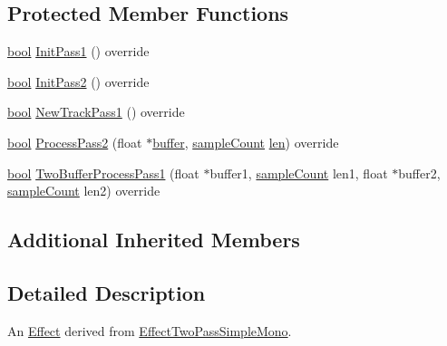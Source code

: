 \subsection*{Protected Member Functions}
\begin{DoxyCompactItemize}
\item 
\hyperlink{mac_2config_2i386_2lib-src_2libsoxr_2soxr-config_8h_abb452686968e48b67397da5f97445f5b}{bool} \hyperlink{class_effect_compressor_a20950a5cee99fbeb9bb59d547dce1e3f}{Init\+Pass1} () override
\item 
\hyperlink{mac_2config_2i386_2lib-src_2libsoxr_2soxr-config_8h_abb452686968e48b67397da5f97445f5b}{bool} \hyperlink{class_effect_compressor_af1dcade46fe85fb1c048f3b87cf26dd1}{Init\+Pass2} () override
\item 
\hyperlink{mac_2config_2i386_2lib-src_2libsoxr_2soxr-config_8h_abb452686968e48b67397da5f97445f5b}{bool} \hyperlink{class_effect_compressor_afa8c1943b9bac85e3d5f89d740230e7b}{New\+Track\+Pass1} () override
\item 
\hyperlink{mac_2config_2i386_2lib-src_2libsoxr_2soxr-config_8h_abb452686968e48b67397da5f97445f5b}{bool} \hyperlink{class_effect_compressor_a4692ee5a526a8ba58501eed3f8cd967e}{Process\+Pass2} (float $\ast$\hyperlink{structbuffer}{buffer}, \hyperlink{include_2audacity_2_types_8h_afa427e1f521ea5ec12d054e8bd4d0f71}{sample\+Count} \hyperlink{lib_2expat_8h_af86d325fecfc8f47b61fbf5a5146f582}{len}) override
\item 
\hyperlink{mac_2config_2i386_2lib-src_2libsoxr_2soxr-config_8h_abb452686968e48b67397da5f97445f5b}{bool} \hyperlink{class_effect_compressor_a4906e985a249d9ff70ee8c82bf841a17}{Two\+Buffer\+Process\+Pass1} (float $\ast$buffer1, \hyperlink{include_2audacity_2_types_8h_afa427e1f521ea5ec12d054e8bd4d0f71}{sample\+Count} len1, float $\ast$buffer2, \hyperlink{include_2audacity_2_types_8h_afa427e1f521ea5ec12d054e8bd4d0f71}{sample\+Count} len2) override
\end{DoxyCompactItemize}
\subsection*{Additional Inherited Members}


\subsection{Detailed Description}
An \hyperlink{class_effect}{Effect} derived from \hyperlink{class_effect_two_pass_simple_mono}{Effect\+Two\+Pass\+Simple\+Mono}. 


